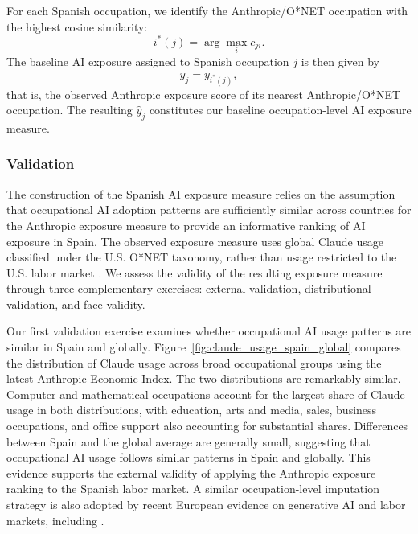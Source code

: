 
For each Spanish occupation, we identify the Anthropic/O*NET occupation with the highest cosine similarity:
\[
i^*(j)=\arg\max_i c_{ji}.
\]
The baseline AI exposure assigned to Spanish occupation $j$ is then given by
\[
\widehat{y}_j=y_{i^*(j)},
\]
that is, the observed Anthropic exposure score of its nearest Anthropic/O*NET occupation. The resulting $\widehat{y}_j$ constitutes our baseline occupation-level AI exposure measure.


\subsubsection{Validation}

The construction of the Spanish AI exposure measure relies on the assumption that occupational AI adoption patterns are sufficiently similar across countries for the Anthropic exposure measure to provide an informative ranking of AI exposure in Spain. The observed exposure measure uses global Claude usage classified under the U.S. O*NET taxonomy, rather than usage restricted to the U.S. labor market \citep{massenkoff_mccrory_2026}. We assess the validity of the resulting exposure measure through three complementary exercises: external validation, distributional validation, and face validity.

Our first validation exercise examines whether occupational AI usage patterns are similar in Spain and globally. Figure~\ref{fig:claude_usage_spain_global} compares the distribution of Claude usage across broad occupational groups using the latest Anthropic Economic Index. The two distributions are remarkably similar. Computer and mathematical occupations account for the largest share of Claude usage in both distributions, with education, arts and media, sales, business occupations, and office support also accounting for substantial shares. Differences between Spain and the global average are generally small, suggesting that occupational AI usage follows similar patterns in Spain and globally. This evidence supports the external validity of applying the Anthropic exposure ranking to the Spanish labor market. A similar occupation-level imputation strategy is also adopted by recent European evidence on generative AI and labor markets, including \citet{facius_iacono_2026}.

